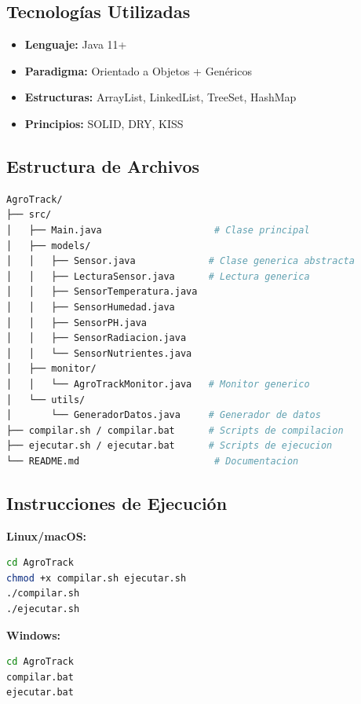 \documentclass[12pt,a4paper]{article}
\begin{document}
\subsection{Tecnologías Utilizadas}

\begin{itemize}
    \item \textbf{Lenguaje:} Java 11+
    \item \textbf{Paradigma:} Orientado a Objetos + Genéricos
    \item \textbf{Estructuras:} ArrayList, LinkedList, TreeSet, HashMap
    \item \textbf{Principios:} SOLID, DRY, KISS
\end{itemize}

\subsection{Estructura de Archivos}

\begin{lstlisting}[language=bash, basicstyle=\ttfamily\small]
AgroTrack/
├── src/
│   ├── Main.java                    # Clase principal
│   ├── models/
│   │   ├── Sensor.java             # Clase generica abstracta
│   │   ├── LecturaSensor.java      # Lectura generica
│   │   ├── SensorTemperatura.java
│   │   ├── SensorHumedad.java
│   │   ├── SensorPH.java
│   │   ├── SensorRadiacion.java
│   │   └── SensorNutrientes.java
│   ├── monitor/
│   │   └── AgroTrackMonitor.java   # Monitor generico
│   └── utils/
│       └── GeneradorDatos.java     # Generador de datos
├── compilar.sh / compilar.bat      # Scripts de compilacion
├── ejecutar.sh / ejecutar.bat      # Scripts de ejecucion
└── README.md                        # Documentacion
\end{lstlisting}

\subsection{Instrucciones de Ejecución}

\textbf{Linux/macOS:}
\begin{lstlisting}[language=bash]
cd AgroTrack
chmod +x compilar.sh ejecutar.sh
./compilar.sh
./ejecutar.sh
\end{lstlisting}

\textbf{Windows:}
\begin{lstlisting}[language=bash]
cd AgroTrack
compilar.bat
ejecutar.bat
\end{lstlisting}
\end{document}
